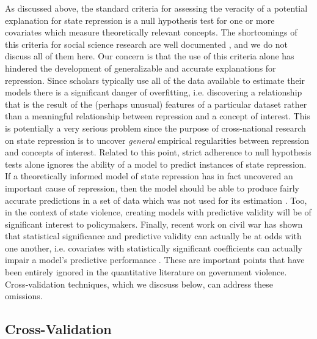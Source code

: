 \documentclass[12pt]{article}
\begin{document}
As discussed above, the standard criteria for assessing the veracity of a potential explanation for state repression is a null hypothesis test for one or more covariates which measure theoretically relevant concepts. The shortcomings of this criteria for social science research are well documented \citep[See, e.g.][]{Gill1999}, and we do not discuss all of them here. Our concern is that the use of this criteria alone has hindered the development of generalizable and accurate explanations for repression.  Since scholars typically use all of the data available to estimate their models there is a significant danger of overfitting, i.e. discovering a relationship that is the result of the (perhaps unusual) features of a particular dataset rather than a meaningful relationship between repression and a concept of interest. This is potentially a very serious problem since the purpose of cross-national research on state repression is to uncover {\em general} empirical regularities between repression and concepts of interest. Related to this point, strict adherence to null hypothesis tests alone ignores the ability of a model to predict instances of state repression. If a theoretically informed model of state repression has in fact uncovered an important cause of repression, then the model should be able to produce fairly accurate predictions in a set of data which was not used for its estimation \citep[See][]{BeckKingZeng2000,Wardetal2010}. Too, in the context of state violence, creating models with predictive validity will be of significant interest to policymakers. Finally, recent work on civil war has shown that statistical significance and predictive validity can actually be at odds with one another, i.e. covariates with statistically significant coefficients can actually impair a model's predictive performance \citep{Wardetal2010}.  These are important points that have been entirely ignored in the quantitative literature  on government violence. Cross-validation techniques, which we discsuss below, can address these omissions.

\subsection{Cross-Validation}
\end{document}

